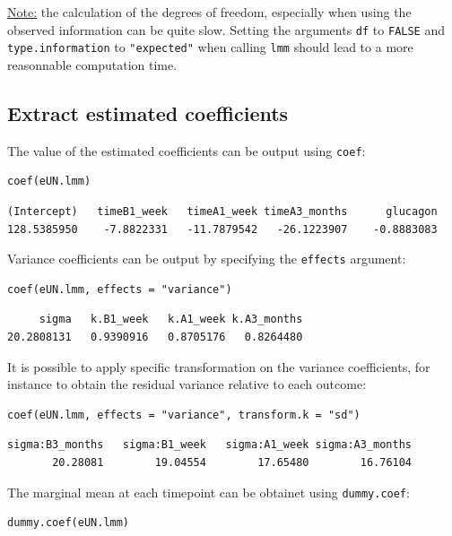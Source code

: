 \documentclass[12pt]{article}
\begin{document}
\uline{Note:} the calculation of the degrees of freedom, especially when
using the observed information can be quite slow. Setting the
arguments \texttt{df} to \texttt{FALSE} and \texttt{type.information} to \texttt{"expected"} when
calling \texttt{lmm} should lead to a more reasonnable computation time.

\subsection{Extract estimated coefficients}
\label{sec:orgd05fd84}
The value of the estimated coefficients can be output using \texttt{coef}:
\lstset{language=r,label= ,caption= ,captionpos=b,numbers=none}
\begin{lstlisting}
coef(eUN.lmm)
\end{lstlisting}

\begin{verbatim}
(Intercept)   timeB1_week   timeA1_week timeA3_months      glucagon 
128.5385950    -7.8822331   -11.7879542   -26.1223907    -0.8883083
\end{verbatim}


Variance coefficients can be output by specifying the \texttt{effects} argument:
\lstset{language=r,label= ,caption= ,captionpos=b,numbers=none}
\begin{lstlisting}
coef(eUN.lmm, effects = "variance")
\end{lstlisting}

\begin{verbatim}
     sigma   k.B1_week   k.A1_week k.A3_months 
20.2808131   0.9390916   0.8705176   0.8264480
\end{verbatim}



It is possible to apply specific transformation on the variance
coefficients, for instance to obtain the residual variance relative to
each outcome:
\lstset{language=r,label= ,caption= ,captionpos=b,numbers=none}
\begin{lstlisting}
coef(eUN.lmm, effects = "variance", transform.k = "sd")
\end{lstlisting}

\begin{verbatim}
sigma:B3_months   sigma:B1_week   sigma:A1_week sigma:A3_months 
       20.28081        19.04554        17.65480        16.76104
\end{verbatim}


The marginal mean at each timepoint can be obtainet using \texttt{dummy.coef}:
\lstset{language=r,label= ,caption= ,captionpos=b,numbers=none}
\begin{lstlisting}
dummy.coef(eUN.lmm)
\end{lstlisting}
\end{document}
